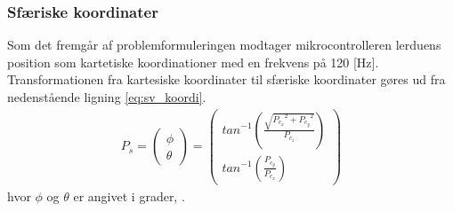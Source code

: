 \subsubsection{Sfæriske koordinater}
Som det fremgår af problemformuleringen modtager mikrocontrolleren lerduens
position som kartetiske koordinationer med en frekvens på 120 [Hz].
Transformationen fra kartesiske koordinater til
sfæriske koordinater gøres ud fra nedenstående ligning \ref{eq:sv_koordi}.
\begin{align}
{ P }_{ s }=\left( \begin{matrix} \phi  \\ \theta  \end{matrix} \right) =\left( \begin{matrix} { tan }^{ -1 }\left( \frac { \sqrt { { { P }_{ c_{ x } } }^{ 2 }+{ { P }_{ c_{ y } } }^{ 2 } }  }{ { P }_{ c_{ z } } }  \right)  \\ { tan }^{ -1 }\left( \frac { { P }_{ c_{ y } } }{ { P }_{ c_{ x } } }  \right)  \end{matrix} \right) 
\label{eq:sv_koordi}
\end{align}
hvor \(\phi\) og \(\theta\) er angivet i grader, \citep[Kap. 10.6]{adam}.
